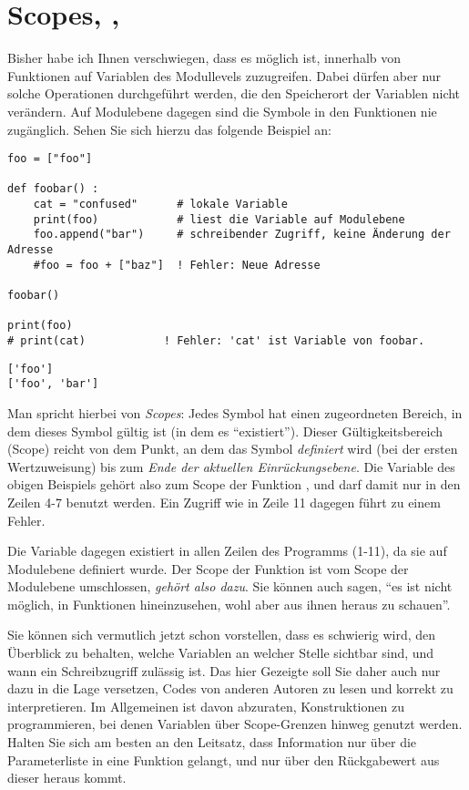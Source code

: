 \section{Scopes, , }
Bisher habe ich Ihnen verschwiegen, dass es möglich ist, innerhalb von Funktionen auf Variablen des Modullevels zuzugreifen. Dabei dürfen aber nur solche Operationen durchgeführt werden, die den Speicherort der Variablen nicht verändern. Auf Modulebene dagegen sind die Symbole in den Funktionen nie zugänglich.
Sehen Sie sich hierzu das folgende Beispiel an:
\begin{codebox}
\begin{verbatim}
foo = ["foo"]

def foobar() :
    cat = "confused"      # lokale Variable
    print(foo)            # liest die Variable auf Modulebene
    foo.append("bar")     # schreibender Zugriff, keine Änderung der Adresse
    #foo = foo + ["baz"]  ! Fehler: Neue Adresse

foobar()

print(foo)
# print(cat)            ! Fehler: 'cat' ist Variable von foobar.
\end{verbatim}
\end{codebox}
\begin{cmdbox}
\begin{verbatim}
['foo']
['foo', 'bar']
\end{verbatim}
\end{cmdbox}

Man spricht hierbei von \emph{Scopes}: Jedes Symbol hat einen zugeordneten Bereich, in dem dieses Symbol gültig ist (in dem es \enquote{existiert}). Dieser Gültigkeitsbereich (Scope) reicht von dem Punkt, an dem das Symbol \emph{definiert} wird (\ie bei der ersten Wertzuweisung) bis zum \emph{Ende der aktuellen Einrückungsebene}. Die Variable  des obigen Beispiels gehört also zum Scope der Funktion , und darf damit nur in den Zeilen 4-7 benutzt werden. Ein Zugriff wie in Zeile 11 dagegen führt zu einem Fehler.

Die Variable  dagegen existiert in allen Zeilen des Programms (1-11), da sie auf Modulebene definiert wurde. Der Scope der Funktion  ist vom Scope der Modulebene umschlossen, \emph{gehört also dazu}. Sie können auch sagen, \enquote{es ist nicht möglich, in Funktionen hineinzusehen, wohl aber aus ihnen heraus zu schauen}.

\begin{warnbox}
Sie können sich vermutlich jetzt schon vorstellen, dass es schwierig wird, den Überblick zu behalten, welche Variablen an welcher Stelle sichtbar sind, und wann ein Schreibzugriff zulässig ist. Das hier Gezeigte soll Sie daher auch nur dazu in die Lage versetzen, Codes von anderen Autoren zu lesen und korrekt zu interpretieren. Im Allgemeinen ist davon abzuraten, Konstruktionen zu programmieren, bei denen Variablen über Scope-Grenzen hinweg genutzt werden. Halten Sie sich am besten an den Leitsatz, dass Information nur über die Parameterliste in eine Funktion gelangt, und nur über den Rückgabewert aus dieser heraus kommt.
\end{warnbox}

